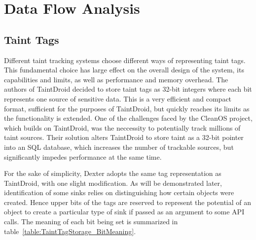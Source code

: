 \documentclass[12pt,twoside,notitlepage]{report}
\begin{document}
\section{Data Flow Analysis}

\subsection{Taint Tags}

Different taint tracking systems choose different ways of representing taint tags. This fundamental choice has large effect on the overall design of the system, its capabilities and limits, as well as performance and memory overhead. The authors of TaintDroid decided to store taint tags as 32-bit integers where each bit represents one source of sensitive data. This is a very efficient and compact format, sufficient for the purposes of TaintDroid, but quickly reaches its limits as the functionality is extended. One of the challenges faced by the CleanOS project, which builds on TaintDroid, was the neccessity to potentially track millions of taint sources. Their solution alters TaintDroid to store taint as a 32-bit pointer into an SQL database, which increases the number of trackable sources, but significantly impedes performance at the same time. 

For the sake of simplicity, Dexter adopts the same tag representation as TaintDroid, with one slight modification. As will be demonstrated later, identification of some sinks relies on distinguishing how certain objects were created. Hence upper bits of the tags are reserved to represent the potential of an object to create a particular type of sink if passed as an argument to some API calls. The meaning of each bit being set is summarized in table~\ref{table:TaintTagStorage_BitMeaning}.
\end{document}
